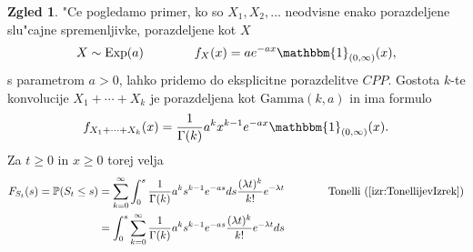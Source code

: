 \documentclass[12pt, a4paper, reqno]{amsart}
\theoremstyle{definition}
\newtheorem{zgled}[definicija]{Zgled}
\theoremstyle{plain}
\newcommand{\Prob}{\mathbb{P}}
\newcommand{\1}{\mathds{1}}
\begin{document}
    \begin{zgled}
        "Ce pogledamo primer, ko so $X_1, X_2, \dots$ neodvisne enako porazdeljene slu"cajne spremenljivke,
        porazdeljene kot $X$
        \begin{equation*}
            X\sim\text{Exp}(a) \qquad \qquad f_X(x) = ae^{-ax}\mathbbm{1}_{(0, \infty)}(x),
        \end{equation*}
        s parametrom $a>0$, lahko pridemo do  eksplicitne porazdelitve $CPP$. Gostota $k$-te 
        konvolucije $X_1 + \cdots + X_k$ je porazdeljena kot $\text{Gamma}(k, a)$ in ima formulo
        \begin{equation*}
            f_{X_1 + \cdots + X_k}(x) = \frac{1}{\Gamma(k)}a^kx^{k-1}e^{-ax}\mathbbm{1}_{(0, \infty)}(x).
        \end{equation*}
        Za $t\geq 0$ in $x \geq 0$ torej velja
        \begin{align*}
            F_{S_t}(s) = \Prob(S_t \leq s)
            &= \sum_{k=0}^\infty \int_0^s\frac{1}{\Gamma(k)}a^ks^{k-1}e^{-as}ds\frac{(\lambda t)^k}{k!}e^{-\lambda t}
            \qquad \qquad \text{Tonelli} \ (\ref{izr:TonellijevIzrek}) \\
            &= \int_0^s\sum_{k=0}^\infty \frac{1}{\Gamma(k)}a^ks^{k-1}e^{-as}\frac{(\lambda t)^k}{k!}e^{-\lambda t}ds
        \end{align*}

        

    \end{zgled}
    
    
\end{document}
